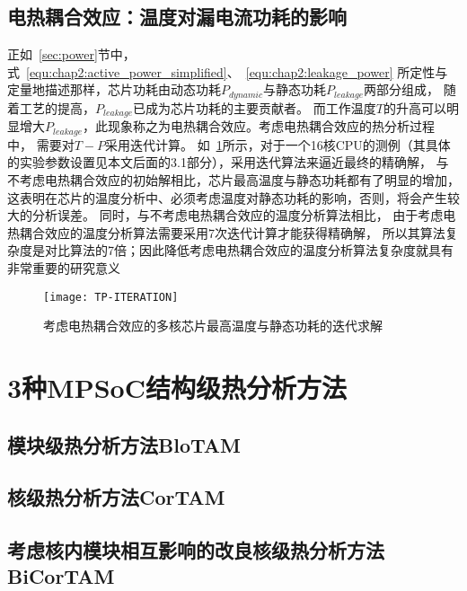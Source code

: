 \subsection{电热耦合效应：温度对漏电流功耗的影响}
正如~\ref{sec:power}节中，式~\ref{equ:chap2:active_power_simplified}、~\ref{equ:chap2:leakage_power} 所定性与定量地描述那样，芯片功耗由动态功耗$P_{dynamic}$与静态功耗$P_{leakage}$两部分组成， 随着工艺的提高，$P_{leakage}$已成为芯片功耗的主要贡献者。 而工作温度$T$的升高可以明显增大$P_{leakage}$，此现象称之为电热耦合效应。考虑电热耦合效应的热分析过程中， 需要对$T-P$采用迭代计算。
如~\ref{fig:tp-iteration}所示，对于一个16核CPU的测例（其具体的实验参数设置见本文后面的3.1部分），采用迭代算法来逼近最终的精确解， 与不考虑电热耦合效应的初始解相比，芯片最高温度与静态功耗都有了明显的增加， 这表明在芯片的温度分析中、必须考虑温度对静态功耗的影响，否则，将会产生较大的分析误差。 同时，与不考虑电热耦合效应的温度分析算法相比， 由于考虑电热耦合效应的温度分析算法需要采用7次迭代计算才能获得精确解， 所以其算法复杂度是对比算法的7倍；因此降低考虑电热耦合效应的温度分析算法复杂度就具有非常重要的研究意义
\begin{figure}[H]
  \centering
  \texttt{[image: TP-ITERATION]}
  \caption{考虑电热耦合效应的多核芯片最高温度与静态功耗的迭代求解}
  \label{fig:tp-iteration}
\end{figure}


\section{3种MPSoC结构级热分析方法}
\label{sec:SSTAmethod}

\subsection{模块级热分析方法BloTAM}

\subsection{核级热分析方法CorTAM}

\subsection{考虑核内模块相互影响的改良核级热分析方法BiCorTAM}











